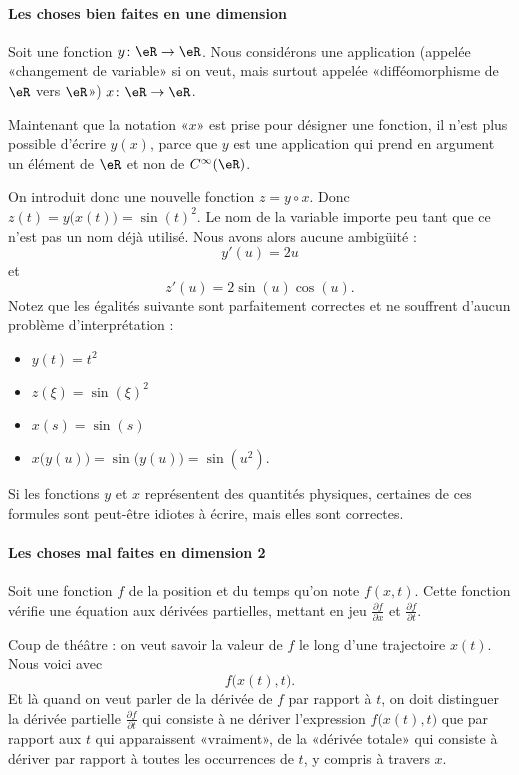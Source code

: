 \paragraph{Les choses bien faites en une dimension}

Soit une fonction \( y\colon \eR\to \eR\). Nous considérons une application (appelée «changement de variable» si on veut, mais surtout appelée «difféomorphisme de \( \eR\) vers \( \eR\)») \( x\colon \eR\to \eR\).

Maintenant que la notation «\( x\)» est prise pour désigner une fonction, il n'est plus possible d'écrire \( y(x)\), parce que \( y\) est une application qui prend en argument un élément de \( \eR\) et non de \(  C^{\infty}(\eR)\).

On introduit donc une nouvelle fonction \( z=y\circ x\). Donc \( z(t)=y\big( x(t) \big)=\sin(t)^2\). Le nom de la variable importe peu tant que ce n'est pas un nom déjà utilisé. Nous avons alors aucune ambigüité :
\begin{equation}
	y'(u)=2u
\end{equation}
et
\begin{equation}
	z'(u)=2\sin(u)\cos(u).
\end{equation}
Notez que les égalités suivante sont parfaitement correctes et ne souffrent d'aucun problème d'interprétation :
\begin{itemize}
	\item
	      \( y(t)=t^2\)
	\item
	      \( z(\xi)=\sin(\xi)^2\)
	\item
	      \( x(s)=\sin(s)\)
	\item
	      \( x\big( y(u) \big)=\sin\big( y(u) \big)=\sin(u^2)\).
\end{itemize}
Si les fonctions \( y\) et \( x\) représentent des quantités physiques, certaines de ces formules sont peut-être idiotes à écrire, mais elles sont correctes.

\paragraph{Les choses mal faites en dimension 2}

Soit une fonction \( f\) de la position et du temps qu'on note \( f(x,t)\). Cette fonction vérifie une équation aux dérivées partielles, mettant en jeu \( \frac{ \partial f }{ \partial x }\) et \( \frac{ \partial f }{ \partial t }\).

Coup de théâtre : on veut savoir la valeur de \( f\) le long d'une trajectoire \( x(t)\). Nous voici avec
\begin{equation}
	f\big( x(t), t \big).
\end{equation}
Et là quand on veut parler de la dérivée de \( f\) par rapport à \( t\), on doit distinguer la dérivée partielle \( \frac{ \partial f }{ \partial t }\) qui consiste à ne dériver l'expression \( f\big( x(t),t \big)\) que par rapport aux \( t\) qui apparaissent «vraiment», de la «dérivée totale» qui consiste à dériver par rapport à toutes les occurrences de \( t\), y compris à travers \( x\).

